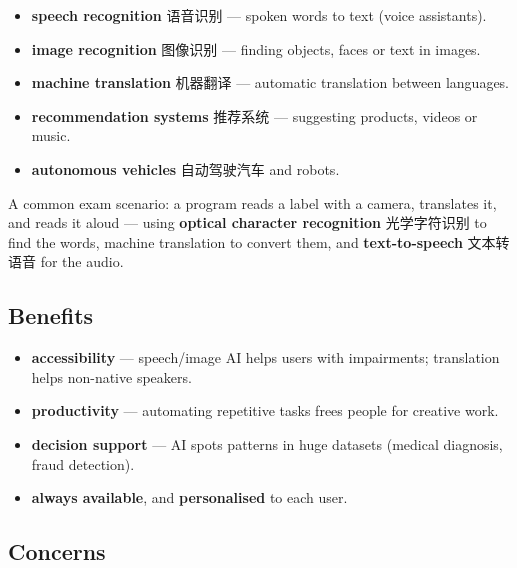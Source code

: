\documentclass[11pt]{article}
\begin{document}
\begin{itemize}
\item \textbf{speech recognition} 语音识别 — spoken words to text (voice assistants).

\item \textbf{image recognition} 图像识别 — finding objects, faces or text in images.

\item \textbf{machine translation} 机器翻译 — automatic translation between languages.

\item \textbf{recommendation systems} 推荐系统 — suggesting products, videos or music.

\item \textbf{autonomous vehicles} 自动驾驶汽车 and robots.

\end{itemize}

A common exam scenario: a program reads a label with a camera, translates it, and reads it aloud — using \textbf{optical character recognition} 光学字符识别 to find the words, machine translation to convert them, and \textbf{text-to-speech} 文本转语音 for the audio.

\subsection*{Benefits}

\begin{itemize}
\item \textbf{accessibility} — speech/image AI helps users with impairments; translation helps non-native speakers.

\item \textbf{productivity} — automating repetitive tasks frees people for creative work.

\item \textbf{decision support} — AI spots patterns in huge datasets (medical diagnosis, fraud detection).

\item \textbf{always available}, and \textbf{personalised} to each user.

\end{itemize}

\subsection*{Concerns}
\end{document}
